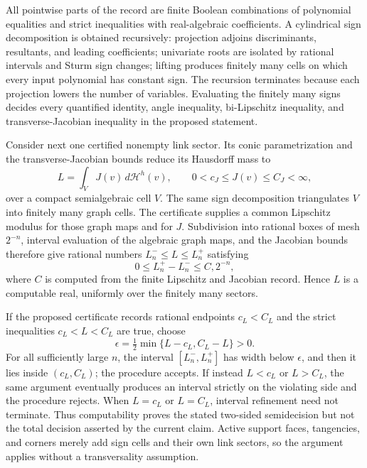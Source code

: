 All pointwise parts of the record are finite Boolean combinations of polynomial equalities and strict inequalities with real-algebraic coefficients. A cylindrical sign decomposition is obtained recursively: projection adjoins discriminants, resultants, and leading coefficients; univariate roots are isolated by rational intervals and Sturm sign changes; lifting produces finitely many cells on which every input polynomial has constant sign. The recursion terminates because each projection lowers the number of variables. Evaluating the finitely many signs decides every quantified identity, angle inequality, bi-Lipschitz inequality, and transverse-Jacobian inequality in the proposed statement.

Consider next one certified nonempty link sector. Its conic parametrization and the transverse-Jacobian bounds reduce its Hausdorff mass to
\[
L=\int_V J(v)\,d\mathcal H^h(v),
\qquad 0<c_J\le J(v)\le C_J<\infty,
\]
over a compact semialgebraic cell \(V\). The same sign decomposition triangulates \(V\) into finitely many graph cells. The certificate supplies a common Lipschitz modulus for those graph maps and for \(J\). Subdivision into rational boxes of mesh \(2^{-n}\), interval evaluation of the algebraic graph maps, and the Jacobian bounds therefore give rational numbers \(L_n^-\le L\le L_n^+\) satisfying
\[
0\le L_n^+-L_n^-\le C,2^{-n},
\]
where \(C\) is computed from the finite Lipschitz and Jacobian record. Hence \(L\) is a computable real, uniformly over the finitely many sectors.

If the proposed certificate records rational endpoints \(c_L<C_L\) and the strict inequalities \(c_L<L<C_L\) are true, choose
\[
\epsilon=\tfrac12\min\{L-c_L,C_L-L\}>0.
\]
For all sufficiently large \(n\), the interval \([L_n^-,L_n^+]\) has width below \(\epsilon\), and then it lies inside \((c_L,C_L)\); the procedure accepts. If instead \(L<c_L\) or \(L>C_L\), the same argument eventually produces an interval strictly on the violating side and the procedure rejects. When \(L=c_L\) or \(L=C_L\), interval refinement need not terminate. Thus computability proves the stated two-sided semidecision but not the total decision asserted by the current claim. Active support faces, tangencies, and corners merely add sign cells and their own link sectors, so the argument applies without a transversality assumption.